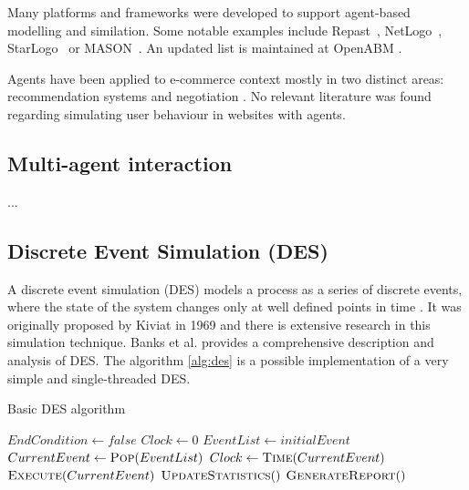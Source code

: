 Many platforms and frameworks were developed to support agent-based modelling 
and similation. Some notable examples include Repast~\cite{collier2003repast}, 
NetLogo~\cite{wilensky1999netlogo}, StarLogo~\cite{resnick1996starlogo} or 
MASON~\cite{panait2005cooperative}. An updated list is maintained at OpenABM 
\cite{OpenABM2016}.

Agents have been applied to e-commerce context mostly in two distinct areas: 
recommendation systems \cite{xiao2007commerce, walter2008model} and negotiation 
\cite{rahwan2002intelligent, maes1999agents}. No relevant literature was found 
regarding simulating user behaviour in websites with agents.

\subsection{Multi-agent interaction}

...

\subsection{Discrete Event Simulation (DES)} \label{ssec:des}

A discrete event simulation (DES) models a process as a series of discrete 
events, where the state of the system changes only at well defined points in 
time \cite{Siebers2010}. It was originally proposed by Kiviat in 1969 
\cite{Kiviat1969} and there is extensive research in this simulation technique. 
Banks et al. \cite{Banks2004} provides a comprehensive description and analysis 
of DES. The algorithm \ref{alg:des} is a possible implementation of a very 
simple and single-threaded DES.

\begin{algorithm}[h]
    \caption{Basic DES algorithm}
    \label{alg:des}
    \begin{algorithmic}
        \State $EndCondition \gets false$
        \State $Clock \gets 0$
        \State $EventList \gets initialEvent$
        \State $CurrentEvent \gets \Call{Pop}{EventList}$
        \State $Clock \gets \Call{Time}{CurrentEvent}$
        \State $\Call{Execute}{CurrentEvent}$ 
        \State $\Call{UpdateStatistics}$
        \EndWhile
        \State $\Call{GenerateReport}$
    \end{algorithmic}
\end{algorithm}

